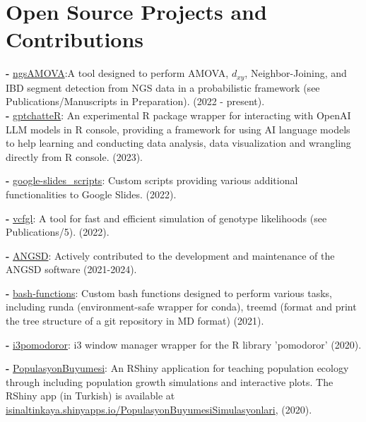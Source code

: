 \documentclass[letterpaper,10.5pt]{article}
\begin{document}
\section{Open Source Projects and Contributions}
\textbf{-}   \href{https://github.com/isinaltinkaya/ngsAMOVA}{ngsAMOVA}:A tool designed to perform AMOVA, $d_{xy}$, Neighbor-Joining, and IBD segment detection from NGS data in a probabilistic framework (see Publications/Manuscripts in Preparation). (2022 - present).  \\
\smallskip
\textbf{-}  \href{https://github.com/isinaltinkaya/gptchatteR}{gptchatteR}: An experimental R package wrapper for interacting with OpenAI LLM models in R console, providing a framework for using AI language models to help learning and conducting data analysis, data visualization and wrangling directly from R console. (2023). \\
\smallskip

\textbf{-}  \href{https://github.com/isinaltinkaya/google-slides_scripts}{google-slides\_scripts}: Custom scripts providing various additional functionalities to Google Slides. (2022). \\
\smallskip

\textbf{-}  \href{https://github.com/isinaltinkaya/vcfgl}{vcfgl}: A tool for fast and efficient simulation of genotype likelihoods (see Publications/5). (2022). \\
\smallskip

\textbf{-}  \href{https://github.com/ANGSD/angsd}{ANGSD}: Actively contributed to the development and maintenance of the ANGSD software (2021-2024).\\
\smallskip

\textbf{-}  \href{https://github.com/isinaltinkaya/bash-functions}{bash-functions}: Custom bash functions designed to perform various tasks, including runda (environment-safe wrapper for conda), treemd (format and print the tree structure of a git repository in MD format) (2021).
\smallskip

\textbf{-}  \href{https://github.com/isinaltinkaya/i3pomodoror}{i3pomodoror}: i3 window manager wrapper for the R library 'pomodoror' (2020). \\
\smallskip

\textbf{-}  \href{https://github.com/isinaltinkaya/PopulasyonBuyumesi}{PopulasyonBuyumesi}: An RShiny application for teaching population ecology through including population growth simulations and interactive plots. The RShiny app (in Turkish) is  available at \href{ PopulasyonBuyumesiSimulasyonlari.isinaltinkaya.com/}{isinaltinkaya.shinyapps.io/PopulasyonBuyumesiSimulasyonlari}, (2020).\\
\smallskip
\end{document}
